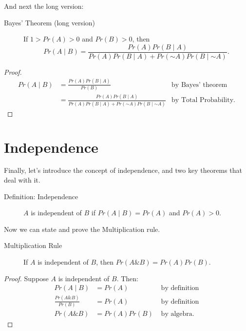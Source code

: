 \documentclass[justified]{tufte-book}
\newcommand{\given}{\mid}
\renewcommand{\neg}{\mathbin{\sim}}
\renewcommand{\wedge}{\mathbin{\&}}
\newcommand{\p}{Pr}
\theoremstyle{definition}
\theoremstyle{definition}
\theoremstyle{definition}
\theoremstyle{definition}
\theoremstyle{remark}
\begin{document}
And next the long version:

\begin{description}
\item[Bayes' Theorem (long version)]
If \(1 > \p(A) > 0\) and \(\p(B)>0\), then
\[ \p(A \given B) = \frac{\p(A)\p(B \given A)}{\p(A)\p(B \given A) + \p(\neg A)\p(B \given \neg A)}. \]
\end{description}

\begin{proof}
{}
\[
  \begin{aligned}
    \p(A \given B) 
      &= \frac{\p(A)\p(B \given A)}{\p(B)} & \mbox{by Bayes' theorem}\\
      &= \frac{\p(A)\p(B \given A)}{\p(A)\p(B \given A) + \p(\neg A)\p(B \given \neg A)} & \mbox{by Total Probability.}
  \end{aligned}
\]
\end{proof}

\hypertarget{independence-1}{%
\section*{Independence}\label{independence-1}}

Finally, let's introduce the concept of independence, and two key theorems that deal with it.

\begin{description}
\item[Definition: Independence]
\(A\) is independent of \(B\) if \(\p(A \given B) = \p(A)\) and \(\p(A) > 0\).
\end{description}

Now we can state and prove the Multiplication rule.

\begin{description}
\item[Multiplication Rule]
If \(A\) is independent of \(B\), then \(\p(A \wedge B) = \p(A)\p(B)\).
\end{description}

\begin{proof}
{}
Suppose \(A\) is independent of \(B\). Then:
\[
  \begin{aligned}
    \p(A \given B) &= \p(A)                &  \mbox{ by definition}\\
    \frac{\p(A \wedge B)}{\p(B)} &= \p(A)  &  \mbox{ by definition}\\
    \p(A \wedge B) &= \p(A) \p(B)          &  \mbox{ by algebra.}
\end{aligned}
\]
\end{proof}
\end{document}
